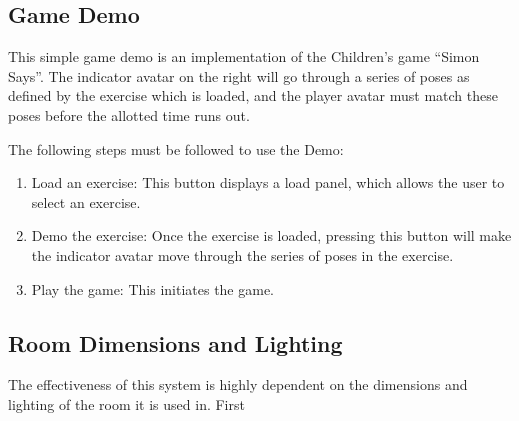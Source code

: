 \documentclass{report}
\begin{document}
\subsection{Game Demo}
This simple game demo is an implementation of the Children's game ``Simon Says''. The indicator avatar on the right will go through a series of poses as defined by the exercise which is loaded, and the player avatar must match these poses before the allotted time runs out.

The following steps must be followed to use the Demo:

\begin{enumerate}
	\item Load an exercise: This button displays a load panel, which allows the user to select an exercise.

	\item Demo the exercise: Once the exercise is loaded, pressing this button will make the indicator avatar move through the series of poses in the exercise.

	\item Play the game: This initiates the game.
\end{enumerate}

\subsection{Room Dimensions and Lighting}
The effectiveness of this system is highly dependent on the dimensions and lighting of the room it is used in. First

\appendixpage
\label{Report}
\end{document}
